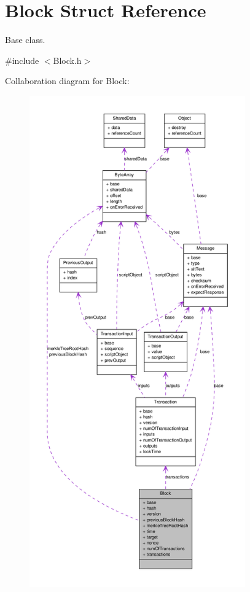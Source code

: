 \hypertarget{struct_block}{
\section{Block Struct Reference}
\label{struct_block}
}


Base class.  




{\ttfamily \#include $<$Block.h$>$}



Collaboration diagram for Block:\nopagebreak
\begin{figure}[H]
\begin{center}
\leavevmode
\includegraphics[height=600pt]{struct_block__coll__graph}
\end{center}
\end{figure}
